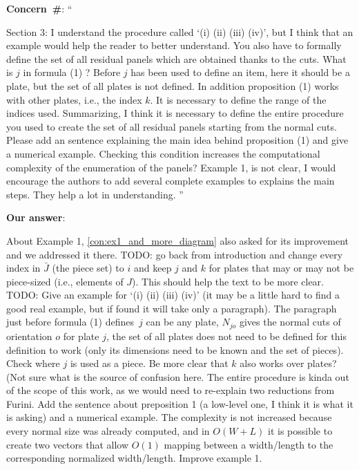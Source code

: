 \documentclass[smallextended]{svjour3}       %
\makeatletter
\newcommand\gobblepars{%
    \@ifnextchar\par%
        {\expandafter\gobblepars\@gobble}%
        {}}
\newcounter{concern}
\newenvironment{concern}{%
    \refstepcounter{concern}\par\smallskip\noindent%
    \textbf{Concern~\#\theconcern}: ``\itshape\gobblepars}%
    {\unskip''\smallskip}
\newcounter{answer}
\newenvironment{answer}{%
    \refstepcounter{answer}\par\smallskip\noindent%
    \textbf{Our answer}: \gobblepars}%
    {\unskip\bigskip}
\makeatother
\begin{document}
\begin{concern}
Section 3: I understand the procedure called `(i) (ii) (iii) (iv)', but I think that an example would help the reader to better understand. You also have to formally define the set of all residual panels which are obtained thanks to the cuts. What is \(j\) in formula (1) ? Before \(j\) has been used to define an item, here it should be a plate, but the set of all plates is not defined. In addition proposition (1) works with other plates, i.e., the index \(k\). It is necessary to define the range of the indices used. Summarizing, I think it is necessary to define the entire procedure you used to create the set of all residual panels starting from the normal cuts. Please add an sentence explaining the main idea behind proposition (1) and give a numerical example. Checking this condition increases the computational complexity of the enumeration of the panels? Example 1, is not clear, I would encourage the authors to add several complete examples to explains the main steps. They help a lot in understanding.\label{con:sec3_concerns}
\end{concern}
\begin{answer}
About Example 1, \autoref{con:ex1_and_more_diagram} also asked for its improvement and we addressed it there.
TODO: go back from introduction and change every index in \(\bar{J}\) (the piece set) to \(i\) and keep \(j\) and \(k\) for plates that may or may not be piece-sized (i.e., elements of \(J\)). This should help the text to be more clear.
TODO: Give an example for `(i) (ii) (iii) (iv)' (it may be a little hard to find a good real example, but if found it will take only a paragraph). The paragraph just before formula (1) defines~\(j\) can be any plate, \(N_{jo}\) gives the normal cuts of orientation \(o\) for plate \(j\), the set of all plates does not need to be defined for this definition to work (only its dimensions need to be known and the set of pieces). Check where \(j\) is used as a piece. Be more clear that \(k\) also works over plates? (Not sure what is the source of confusion here. The entire procedure is kinda out of the scope of this work, as we would need to re-explain two reductions from Furini. Add the sentence about preposition 1 (a low-level one, I think it is what it is asking) and a numerical example. The complexity is not increased because every normal size was already computed, and in \(O(W + L)\) it is possible to create two vectors that allow \(O(1)\) mapping between a width/length to the corresponding normalized width/length. Improve example 1.
\end{answer}
\end{document}
